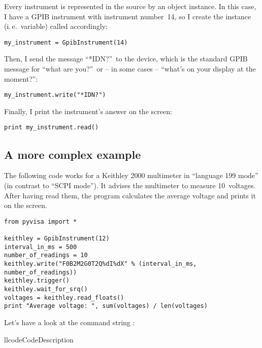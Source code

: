 \documentclass{howto}
\begin{document}
Every instrument is represented in the source by an object instance.  In this case,
I have a GPIB instrument with instrument number~14, so I create the instance
(i.\,e.\ variable) called  accordingly:
\begin{verbatim}
my_instrument = GpibInstrument(14)
\end{verbatim}
Then, I send the message ``*IDN?''\ to the device, which is the standard GPIB
message for ``what are you?''\ or -- in some cases -- ``what's on your display
at the moment?'':
\begin{verbatim}
my_instrument.write("*IDN?")
\end{verbatim}
Finally, I print the instrument's answer on the screen:
\begin{verbatim}
print my_instrument.read()
\end{verbatim}


\subsection{A more complex example}
\label{sec:more-complex-example}

The following code works for a Keithley 2000 multimeter in ``language 199
mode'' (in contrast to ``SCPI mode'').  It advises the multimeter to measure
10~voltages.  After having read them, the program calculates the average
voltage and prints it on the screen.
\begin{verbatim}
from pyvisa import *

keithley = GpibInstrument(12)
interval_in_ms = 500
number_of_readings = 10
keithley.write("F0B2M2G0T2Q%dI%dX" % (interval_in_ms, number_of_readings))
keithley.trigger()
keithley.wait_for_srq()
voltages = keithley.read_floats()
print "Average voltage: ", sum(voltages) / len(voltages)
\end{verbatim}
Let's have a look at the command string :
\begin{tableii}{ll}{code}{Code}{Description}
\end{tableii}
\end{document}
